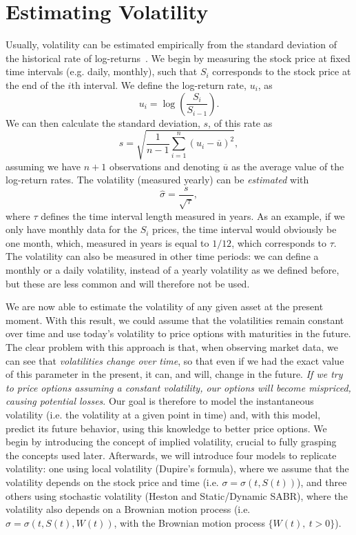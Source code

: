 \section{Estimating Volatility}
Usually, volatility can be estimated empirically from the standard deviation of the historical rate of log-returns~\citep{Hull}.
We begin by measuring the stock price at fixed time intervals (e.g. daily, monthly), such that $S_i$ corresponds to the stock price at the end of the $i$th interval. We define the log-return rate, $u_i$, as
\begin{equation}
u_i=\log\left(\frac{S_i}{S_{i-1}}\right).
\end{equation}
We can then calculate the standard deviation, $s$, of this rate as
\begin{equation}
s=\sqrt{\frac{1}{n-1}\sum_{i=1}^n(u_i-\overline{u})^2},
\end{equation}
\noindent assuming we have $n+1$ observations and denoting $\overline{u}$ as the average value of the log-return rates.
The volatility (measured yearly) can be \emph{estimated} with
\begin{equation}
\hat{\sigma}=\frac{s}{\sqrt{\tau}},
\end{equation}
\noindent where $\tau$ defines the time interval length measured in years. As an example, if we only have monthly data for the $S_i$ prices, the time interval would obviously be one month, which, measured in years is equal to $1/12$, which corresponds to $\tau$.
The volatility can also be measured in other time periods: we can define a monthly or a daily volatility, instead of a yearly volatility as we defined before, but these are less common and will therefore not be used.

We are now able to estimate the volatility of any given asset at the present moment. With this result, we could assume that the volatilities remain constant over time and use today's volatility to price options with maturities in the future. The clear problem with this approach is that, when observing market data, we can see that \emph{volatilities change over time}, so that even if we had the exact value of this parameter in the present, it can, and will, change in the future. \emph{If we try to price options assuming a constant volatility, our options will become mispriced, causing potential losses}.
Our goal is therefore to model the instantaneous volatility (i.e. the volatility at a given point in time) and, with this model, predict its future behavior, using this knowledge to better price options.
We begin by introducing the concept of implied volatility, crucial to fully grasping the concepts used later. Afterwards, we will introduce four models to replicate volatility: one using local volatility (Dupire's formula), where we assume that the volatility depends on the stock price and time (i.e. $\sigma=\sigma(t,S(t))$), and three others using stochastic volatility (Heston and Static/Dynamic SABR), where the volatility also depends on a Brownian motion process (i.e. $\sigma=\sigma(t,S(t),W(t))$, with the Brownian motion process $\{W(t),\ t>0\}$).

